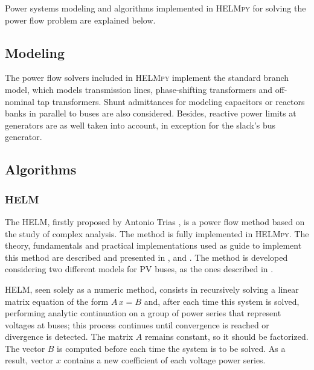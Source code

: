 \documentclass[12pt]{article}
\begin{document}
Power systems modeling and algorithms implemented in \textsc{HELMpy} for solving the power flow problem are explained below.

\subsection{Modeling}
The power flow solvers included in \textsc{HELMpy} implement the standard \boldmath{$\pi$} branch model, which models transmission lines, phase-shifting transformers and off-nominal
tap transformers. Shunt admittances for modeling capacitors or reactors banks in parallel to buses are also considered. Besides, reactive power limits at generators are as well taken into account, in exception for the slack's bus generator.

\subsection{Algorithms}

\subsubsection{HELM}
The HELM, firstly proposed by Antonio Trias \cite{trias2012holomorphic}, is a power flow method based on the study of complex analysis. The method is fully implemented in \textsc{HELMpy}. The theory, fundamentals and practical implementations used as guide to implement this method are described and presented in \cite{subramanian2014application}, \cite{rao2016holomorphic} and \cite{trias2015fundamentals}. The method is developed considering two different models for PV buses, as the ones described in \cite{subramanian2014application}.
 
HELM, seen solely as a numeric method, consists in recursively solving a linear matrix equation of the form $A\,x=B$ and, after each time this system is solved, performing analytic continuation on a group of power series that represent voltages at buses; this process continues until convergence is reached or divergence is detected. The matrix $A$ remains constant, so it should be factorized. The vector $B$ is computed before each time the system is to be solved. As a result, vector $x$ contains a new coefficient of each voltage power series. 
\end{document}
